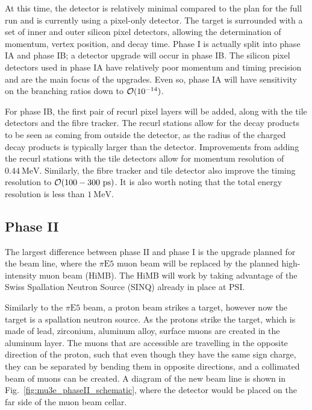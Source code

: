 At this time, the detector is relatively minimal compared to the plan for the full run and is currently using a pixel-only detector.
The target is surrounded with a set of inner and outer silicon pixel detectors, allowing the determination of momentum, vertex position, and decay time.
Phase I is actually split into phase IA and phase IB; a detector upgrade will occur in phase IB\@.
The silicon pixel detectors used in phase IA have relatively poor momentum and timing precision and are the main focus of the upgrades.
Even so, phase IA will have sensitivity on the branching ratios down to $\operatorname{\mathcal{O}}(10^{-14})$.

For phase IB, the first pair of recurl pixel layers will be added, along with the tile detectors and the fibre tracker.
The recurl stations allow for the decay products to be seen as coming from outside the detector, as the radius of the charged decay products is typically larger than the detector.
Improvements from adding the recurl stations with the tile detectors allow for momentum resolution of $0.44~\textrm{MeV}$.
Similarly, the fibre tracker and tile detector also improve the timing resolution to $\operatorname{\mathcal{O}}(100-300~\textrm{ps})$. 
It is also worth noting that the total energy resolution is less than $1~\textrm{MeV}$.

\subsection{Phase II}
The largest difference between phase II and phase I is the upgrade planned for the beam line, where the $\pi\textrm{E5}$ muon beam will be replaced by the planned high-intensity muon beam (HiMB).
The HiMB will work by taking advantage of the Swiss Spallation Neutron Source (SINQ) already in place at PSI.

Similarly to the $\pi\textrm{E5}$ beam, a proton beam strikes a target, however now the target is a spallation neutron source.
As the protons strike the target, which is made of lead, zirconium, aluminum alloy, surface muons are created in the aluminum layer.
The muons that are accessible are travelling in the opposite direction of the proton, such that even though they have the same sign charge, they can be separated by bending them in opposite directions, and a collimated beam of muons can be created.
A diagram of the new beam line is shown in Fig.~\ref{fig:mu3e_phaseII_schematic}, where the \mueee detector would be placed on the far side of the muon beam cellar.

